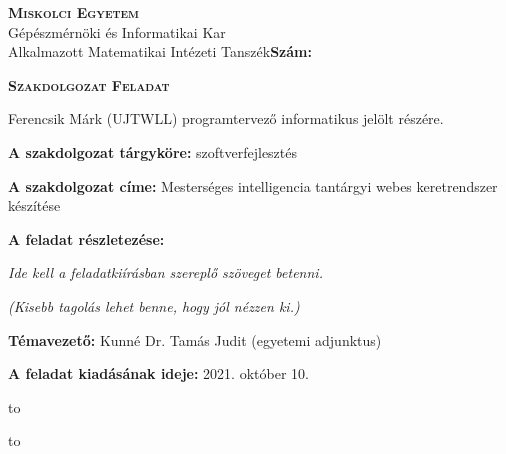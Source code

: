 \begin{flushleft}
    \textsc{\bfseries Miskolci Egyetem}\\
    Gépészmérnöki és Informatikai Kar\\
    Alkalmazott Matematikai Intézeti Tanszék\hspace*{4cm}\hfil \textbf{Szám:}
    \end{flushleft}
    \vskip 0.5cm
    \begin{center}
    \large\textsc{\bfseries Szakdolgozat Feladat}
    \end{center}
    \vskip 0.5cm
    Ferencsik Márk (UJTWLL) programtervező informatikus jelölt részére.\newline
    
    \noindent\textbf{A szakdolgozat tárgyköre:} szoftverfejlesztés\newline
    
    \noindent\textbf{A szakdolgozat címe:} Mesterséges intelligencia tantárgyi webes keretrendszer készítése\newline
    
    \noindent\textbf{A feladat részletezése:}
    
    \medskip
    
    \emph{Ide kell a feladatkiírásban szereplő szöveget betenni.}
    
    \medskip
    
    \emph{(Kisebb tagolás lehet benne, hogy jól nézzen ki.)}
    
    \vfill
    
    \noindent\textbf{Témavezető:} Kunné Dr. Tamás Judit (egyetemi adjunktus) \newline
    
    
    \noindent\textbf{A feladat kiadásának ideje:} 2021. október 10.\newline
    
    
    \vskip 2cm
    
    \hbox to 
    
    \hbox to 
    
    \newpage
    
